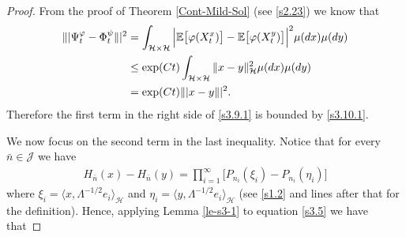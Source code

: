 \documentclass[review, onefignum, onetabnum]{siamart171218}
\begin{document}
\begin{proof}
From the proof of Theorem \ref{Cont-Mild-Sol} (see \eqref{s2.23}) we know that 
\begin{equation}
    \begin{aligned}
        \| | \Psi_t^\varphi-\Phi_t^\psi\| |^2
            &=\int_{\mathcal{H}\times \mathcal{H}} 
            \Big| 
                \E\big [
                    \varphi(X_t^x)
                \big]
                -
                \E\big[
                    \varphi(X_t^y)
                \big] 
            \Big|^2 
            \mu(dx)
            \mu(dy) 
            \\ 
            &\le 
            \exp(Ct)  
            \int_{\mathcal{H}\times \mathcal{H}} 
                \|x-y\|_{\mathcal{H}}^2 
                \mu(dx)\mu(dy) 
            \\
            &= \exp(Ct) \|  |x-y\| |^2.\label{s3.10.1}
    \end{aligned}
\end{equation}
Therefore the first term in the right side of \eqref{s3.9.1} is bounded by 
\eqref{s3.10.1}.

We now focus on the second term in the last inequality. Notice that for every 
$\bar n\in \mathcal{J}$ we have
\begin{align}\label{s3.5}
H_{\bar n}(x)-H_{\bar n}(y)=\prod_{i=1}^\infty 
\Big[P_{n_i}(\xi_i)-P_{n_i}(\eta_i)\Big]  
 \end{align}
where $\xi_i= \langle x,\Lambda^{-1/2}e_i\rangle_{\mathcal{H}}$ and $\eta_i= 
\langle y,\Lambda^{-1/2}e_i\rangle_{\mathcal{H}}$ 
(see \eqref{s1.2} and lines after that for the definition). 
Hence, applying Lemma \ref{le-s3-1} to equation \eqref{s3.5} we have that 


\end{proof}
\end{document}
